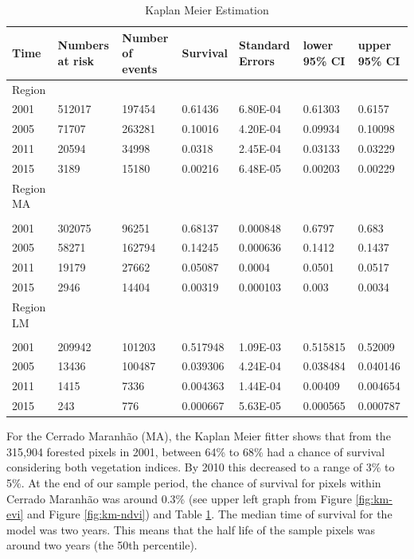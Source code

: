 \begin{table}[H]
\footnotesize
\caption{Kaplan Meier Estimation}
\begin{tabularx}{\linewidth}{l XXXXXX}
\hline
\hline
Time	&	Numbers at risk	&	Number of events	&	Survival 	&	Standard Errors  & lower 95\% CI & upper 95\% CI \\
\hline
Region  &&&&&& \\	
2001	&	512017	&	197454	&	0.61436	&	6.80E-04	&	0.61303	&	0.6157	\\
2005	&	71707	&	263281	&	0.10016	&	4.20E-04	&	0.09934	&	0.10098	\\
2011	&	20594	&	34998	&	0.0318	&	2.45E-04	&	0.03133	&	0.03229	\\
2015	&	3189	&	15180	&	0.00216	&	6.48E-05	&	0.00203	&	0.00229	\\
\hline
Region MA &&&&&& \\												\\
2001	&	302075	&	96251	&	0.68137	&	0.000848	&	0.6797	&	0.683	\\
2005	&	58271	&	162794	&	0.14245	&	0.000636	&	0.1412	&	0.1437	\\
2011	&	19179	&	27662	&	0.05087	&	0.0004	&	0.0501	&	0.0517	\\
2015	&	2946	&	14404	&	0.00319	&	0.000103	&	0.003	&	0.0034	\\
\hline
Region LM &&&&&& \\												\\
2001	&	209942	&	101203	&	0.517948	&	1.09E-03	&	0.515815	&	0.52009	\\
2005	&	13436	&	100487	&	0.039306	&	4.24E-04	&	0.038484	&	0.040146	\\
2011	&	1415	&	7336	&	0.004363	&	1.44E-04	&	0.00409	&	0.004654\\
2015	&	243	&	776	&	0.000667	&	5.63E-05	&	0.000565	&	0.000787\\
\hline
\hline
\end{tabularx}%
\label{tab:KM_estimate}%
\end{table}%

For the Cerrado Maranhão (MA), the Kaplan Meier fitter shows that from the 315,904  forested pixels in 2001, between 64\% to 68\%  had a chance of survival considering both vegetation indices. By 2010 this decreased to a range of 3\% to 5\%. At the end of our sample period, the chance of survival for pixels within Cerrado Maranhão was around 0.3\% (see upper left graph from Figure \ref{fig:km-evi} and Figure \ref{fig:km-ndvi}) and Table \ref{tab:KM_estimate}. The median time of survival for the model was two years. This means that the half life of the sample pixels was around two years (the 50th percentile).

